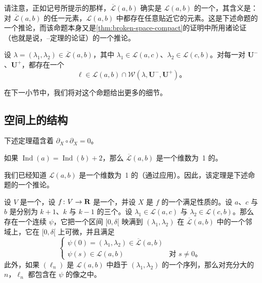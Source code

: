 请注意，正如记号所提示的那样，$\overline{\mathcal{L}}(a,b)$ 确实是 $\mathcal{L}(a,b)$ 的一个\trCompactification，其含义是：对 $\overline{\mathcal{L}}(a,b)$ 的任一元素，$\mathcal{L}(a,b)$ 中都存在任意贴近它的元素。这是下述命题的一个推论，而该命题本身又是\cref{thm:broken-space-compact}的证明中所用诸论证（也就是说，\trCauchy--\trLipschitz{}定理的论证）的一个推论。

\begin{proposition}\label{thm:approximate-broken}
设 $\lambda=(\lambda_1,\lambda_2)\in\overline{\mathcal{L}}(a,b)$，其中 $\lambda_1\in\mathcal{L}(a,c)$、$\lambda_2\in\mathcal{L}(c,b)$。对每一对 $\mathbf{U}^-$、$\mathbf{U}^+$，都存在一个
\[
\ell\in\mathcal{L}(a,b)\cap\mathcal{W}(\lambda,\mathbf{U}^-,\mathbf{U}^+)\text{。}
\]
\noqed
\end{proposition}

在下一小节中，我们将对这个命题给出更多的细节。

\subsection{\trBrokenTrajectory{}空间上的\trManifoldWithBoundary{}结构}
\label{subsec:manifold-structure-broken}

下述定理蕴含着 $\partial_X\circ\partial_X=0$。

\begin{theorem}\label{thm:broken-manifold-boundary}
如果 $\operatorname{Ind}(a)=\operatorname{Ind}(b)+2$，那么 $\overline{\mathcal{L}}(a,b)$ 是一个维数为~1 的\trCompact{}\trManifoldWithBoundary。
\end{theorem}

我们已经知道 $\mathcal{L}(a,b)$ 是一个维数为~1 的\trManifold（通过应用\trSmaleCondition）。因此，该定理是下述命题的一个推论。

\begin{proposition}\label{thm:gluing-embedding}
设 $V$ 是一个\trCompact\trManifold，设 $f\colon V\to\mathbf{R}$ 是一个\trMorseFunction，并设 $X$ 是 $f$ 的一个满足\trSmale{}性质的\trPseudogradient。设 $a$、$c$ 与 $b$ 是\trIndex{}分别为 $k+1$、$k$ 与 $k-1$ 的三个\trCriticalPoint。设 $\lambda_1\in\mathcal{L}(a,c)$ 与 $\lambda_2\in\mathcal{L}(c,b)$。那么存在一个连续\trEmbedding{} $\psi$，它把一个区间 $[0,\delta[$ 映满到 $(\lambda_1,\lambda_2)$ 在 $\overline{\mathcal{L}}(a,b)$ 中的一个邻域上，它在 $[0,\delta[$ 上可微，并且满足
\[
\begin{cases}
\psi(0)=(\lambda_1,\lambda_2)\in\overline{\mathcal{L}}(a,b)\\
\psi(s)\in\mathcal{L}(a,b) & \text{对 } s\neq 0\text{。}
\end{cases}
\]
此外，如果 $(\ell_n)$ 是 $\mathcal{L}(a,b)$ 中趋于 $(\lambda_1,\lambda_2)$ 的一个序列，那么对充分大的 $n$，$\ell_n$ 都包含在 $\psi$ 的像之中。
\end{proposition}

